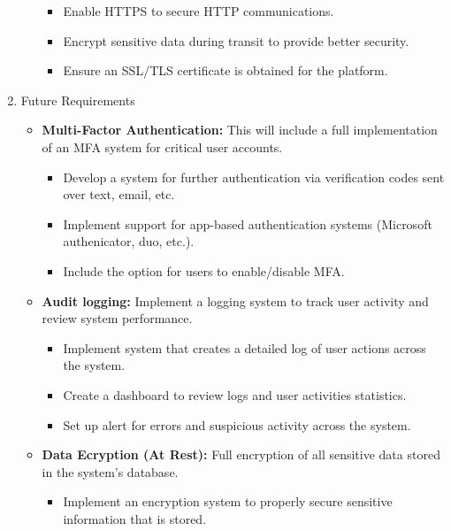 \documentclass{article}
\begin{document}
\begin{enumerate}
\begin{itemize}
                    \begin{itemize}
                        \item Enable HTTPS to secure HTTP communications.
                        \item Encrypt sensitive data during transit to provide better security.
                        \item Ensure an SSL/TLS certificate is obtained for the platform.
                    \end{itemize}
          \end{itemize}
    \item Future Requirements
          \begin{itemize}
              \item \textbf{Multi-Factor Authentication:} This will include a full implementation of an MFA system for critical user accounts.
                    \begin{itemize}
                        \item Develop a system for further authentication via verification codes sent over text, email, etc.
                        \item Implement support for app-based authentication systems (Microsoft authenicator, duo, etc.).
                        \item Include the option for users to enable/disable MFA.
                    \end{itemize}
              \item \textbf{Audit logging:} Implement a logging system to track user activity and review system performance.
                    \begin{itemize}
                        \item Implement system that creates a detailed log of user actions across the system.
                        \item Create a dashboard to review logs and user activities statistics.
                        \item Set up alert for errors and suspicious activity across the system.
                    \end{itemize}
              \item \textbf{Data Ecryption (At Rest):} Full encryption of all sensitive data stored in the system's database.
                    \begin{itemize}
                        \item Implement an encryption system to properly secure sensitive information that is stored.

\end{itemize}
\end{itemize}
\end{enumerate}
\end{document}
